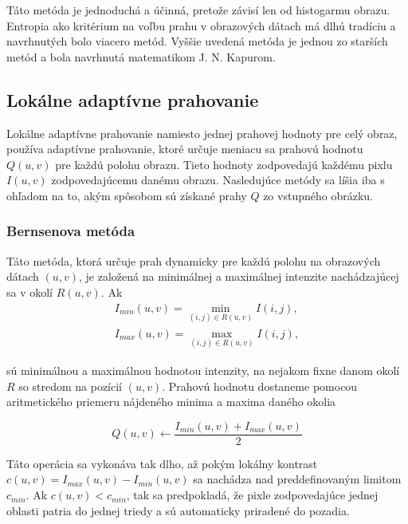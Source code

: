 \documentclass[a4paper,11pt,twoside]{article}%
\begin{document}
Táto metóda je jednoduchá a účinná, pretože závisí len od histogarmu obrazu. %
Entropia ako kritérium na voľbu prahu v obrazových dátach má dlhú tradíciu a navrhnutých bolo viacero metód. Vyššie uvedená metóda je jednou zo starších metód a bola navrhnutá  matematikom J. N. Kapurom.

\subsection{Lokálne adaptívne prahovanie}

Lokálne adaptívne prahovanie namiesto jednej prahovej hodnoty pre celý obraz, používa adaptívne prahovanie, ktoré určuje meniacu sa prahovú hodnotu $Q(u,v)$ pre každú polohu obrazu. Tieto hodnoty zodpovedajú každému pixlu $I(u,v)$ zodpovedajúcemu danému obrazu. Nasledujúce metódy sa líšia iba s ohľadom na to, akým spôsobom sú získané prahy $Q$ zo vstupného obrázku. 

\subsubsection{Bernsenova metóda}

Táto metóda, ktorá určuje prah dynamicky pre každú polohu na obrazových dátach $(u,v)$, je založená na minimálnej a maximálnej intenzite nachádzajúcej sa v okolí $R(u,v)$. Ak 
\begin{equation}
\begin{array}{l}
I_{min}(u,v) = \min\limits_{(i,j)\in R(u,v)} I(i,j),  \\
I_{max}(u,v) = \max\limits_{(i,j)\in R(u,v)} I(i,j),
\end{array}
\end{equation}

sú minimálnou a maximálnou hodnotou intenzity, na nejakom fixne danom okolí $R$ so stredom na pozícií $(u,v)$. Prahovú hodnotu dostaneme pomocou aritmetického priemeru nájdeného minima a maxima daného okolia 

\begin{equation}
Q(u,v) \gets \frac{I_{min}(u,v) + I_{max}(u,v)}{2}
\end{equation}

Táto operácia sa vykonáva tak dlho, až pokým lokálny kontrast $c(u, v) = I_{max}(u, v) − I_{min}(u, v)$ sa nachádza nad preddefinovaným limitom $c_{min}$. Ak $c(u, v) < c_{min}$, tak sa predpokladá, že pixle zodpovedajúce jednej oblasti patria do jednej triedy a sú automaticky priradené do pozadia. 
\end{document}
